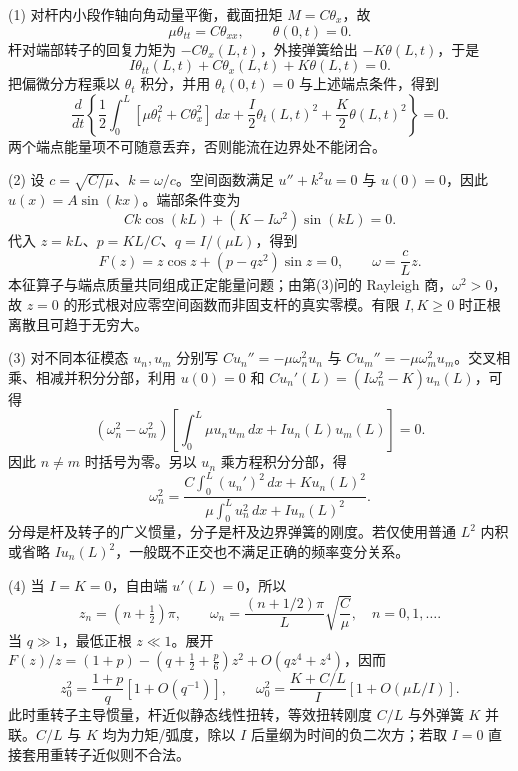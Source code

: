 (1) 对杆内小段作轴向角动量平衡，截面扭矩 \(M=C\theta_x\)，故
\[
 \mu\theta_{tt}=C\theta_{xx},\qquad \theta(0,t)=0.
\]
杆对端部转子的回复力矩为 \(-C\theta_x(L,t)\)，外接弹簧给出 \(-K\theta(L,t)\)，于是
\[
 I\theta_{tt}(L,t)+C\theta_x(L,t)+K\theta(L,t)=0.
\]
把偏微分方程乘以 \(\theta_t\) 积分，并用 \(\theta_t(0,t)=0\) 与上述端点条件，得到
\[
 \frac{d}{dt}\left\{\frac12\int_0^L[\mu\theta_t^2+C\theta_x^2]\,dx
 +\frac I2\theta_t(L,t)^2+\frac K2\theta(L,t)^2\right\}=0.
\]
两个端点能量项不可随意丢弃，否则能流在边界处不能闭合。

(2) 设 \(c=\sqrt{C/\mu}\)、\(k=\omega/c\)。空间函数满足 \(u''+k^2u=0\) 与 \(u(0)=0\)，因此 \(u(x)=A\sin(kx)\)。端部条件变为
\[
 Ck\cos(kL)+(K-I\omega^2)\sin(kL)=0.
\]
代入 \(z=kL\)、\(p=KL/C\)、\(q=I/(\mu L)\)，得到
\[
 F(z)=z\cos z+(p-qz^2)\sin z=0,\qquad
 \omega=\frac{c}{L}z.
\]
本征算子与端点质量共同组成正定能量问题；由第(3)问的 Rayleigh 商，\(\omega^2>0\)，故 \(z=0\) 的形式根对应零空间函数而非固支杆的真实零模。有限 \(I,K\geq0\) 时正根离散且可趋于无穷大。

(3) 对不同本征模态 \(u_n,u_m\) 分别写 \(Cu_n''=-\mu\omega_n^2u_n\) 与 \(Cu_m''=-\mu\omega_m^2u_m\)。交叉相乘、相减并积分分部，利用 \(u(0)=0\) 和
\(Cu_n'(L)=(I\omega_n^2-K)u_n(L)\)，可得
\[
 (\omega_n^2-\omega_m^2)
 \left[\int_0^L\mu u_nu_m\,dx+Iu_n(L)u_m(L)\right]=0.
\]
因此 \(n\ne m\) 时括号为零。另以 \(u_n\) 乘方程积分分部，得
\[
 \omega_n^2=
 \frac{C\int_0^L(u_n')^2\,dx+K u_n(L)^2}
 {\mu\int_0^L u_n^2\,dx+Iu_n(L)^2}.
\]
分母是杆及转子的广义惯量，分子是杆及边界弹簧的刚度。若仅使用普通 \(L^2\) 内积或省略 \(Iu_n(L)^2\)，一般既不正交也不满足正确的频率变分关系。

(4) 当 \(I=K=0\)，自由端 \(u'(L)=0\)，所以
\[
 z_n=(n+\tfrac12)\pi,\qquad
 \omega_n=\frac{(n+1/2)\pi}{L}\sqrt{\frac C\mu},\quad n=0,1,\ldots.
\]
当 \(q\gg1\)，最低正根 \(z\ll1\)。展开 \(F(z)/z=(1+p)-(q+\tfrac12+\tfrac p6)z^2+O(qz^4+z^4)\)，因而
\[
 z_0^2=\frac{1+p}{q}[1+O(q^{-1})],\qquad
 \omega_0^2=\frac{K+C/L}{I}[1+O(\mu L/I)].
\]
此时重转子主导惯量，杆近似静态线性扭转，等效扭转刚度 \(C/L\) 与外弹簧 \(K\) 并联。\(C/L\) 与 \(K\) 均为力矩/弧度，除以 \(I\) 后量纲为时间的负二次方；若取 \(I=0\) 直接套用重转子近似则不合法。
